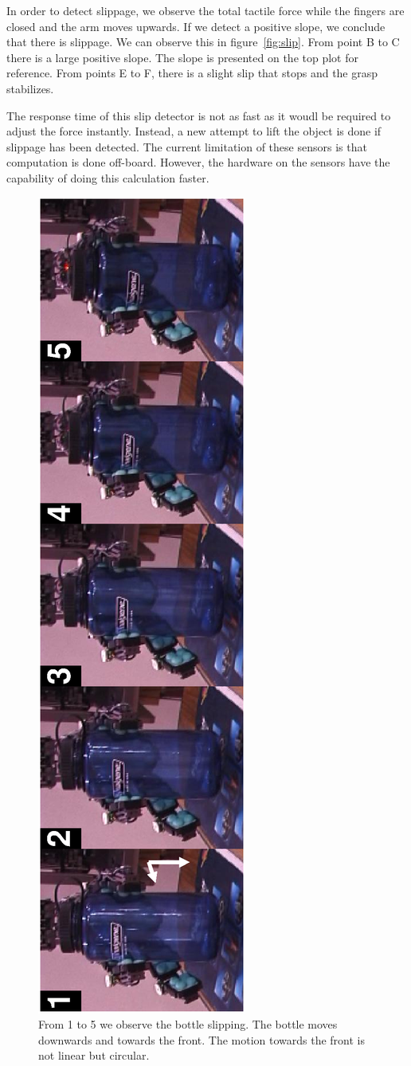 In order to detect slippage, we observe the total tactile force
while the fingers are closed and the arm moves upwards. If we
detect a positive slope, we conclude that there is slippage. We
can observe this in figure~\ref{fig:slip}. From point B to C there
is a large positive slope. The slope is presented on the top plot
for reference. From points E to F, there is a slight slip that
stops and the grasp stabilizes.

The response time of this slip detector is not as fast as it woudl
be required to adjust the force instantly. Instead, a new attempt
to lift the object is done if slippage has been detected. The
current limitation of these sensors is that computation is done
off-board. However, the hardware on the sensors have the
capability of doing this calculation faster.


\begin{figure}[tbp]
\centerline{
\includegraphics[height=\columnwidth, angle=270 ]{./figures/Slippage.eps}
} \caption[Bottle slipping]{From 1 to 5 we observe the bottle
slipping. The bottle moves downwards and towards the front. The
motion towards the front is not linear but circular.}
\label{fig:slipseq}
\end{figure}



